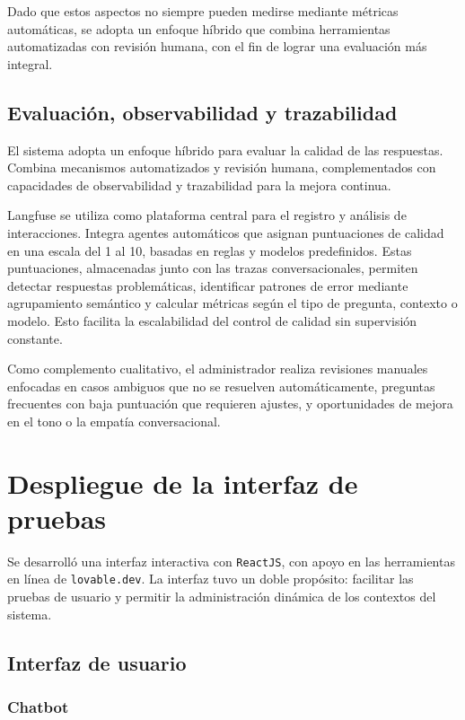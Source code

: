 Dado que estos aspectos no siempre pueden medirse mediante métricas automáticas, se adopta un enfoque híbrido que combina herramientas automatizadas con revisión humana, con el fin de lograr una evaluación más integral.

\subsection{Evaluación, observabilidad y trazabilidad}

El sistema adopta un enfoque híbrido para evaluar la calidad de las respuestas. Combina mecanismos automatizados y revisión humana, complementados con capacidades de observabilidad y trazabilidad para la mejora continua.

Langfuse se utiliza como plataforma central para el registro y análisis de interacciones. Integra agentes automáticos que asignan puntuaciones de calidad en una escala del 1 al 10, basadas en reglas y modelos predefinidos. Estas puntuaciones, almacenadas junto con las trazas conversacionales, permiten detectar respuestas problemáticas, identificar patrones de error mediante agrupamiento semántico y calcular métricas según el tipo de pregunta, contexto o modelo. Esto facilita la escalabilidad del control de calidad sin supervisión constante.

Como complemento cualitativo, el administrador realiza revisiones manuales enfocadas en casos ambiguos que no se resuelven automáticamente, preguntas frecuentes con baja puntuación que requieren ajustes, y oportunidades de mejora en el tono o la empatía conversacional.


\section{Despliegue de la interfaz de pruebas}

Se desarrolló una interfaz interactiva con \texttt{ReactJS}, con apoyo en las herramientas en línea de \texttt{lovable.dev}. La interfaz tuvo un doble propósito: facilitar las pruebas de usuario y permitir la administración dinámica de los contextos del sistema.

\subsection{Interfaz de usuario}

\subsubsection{Chatbot}

